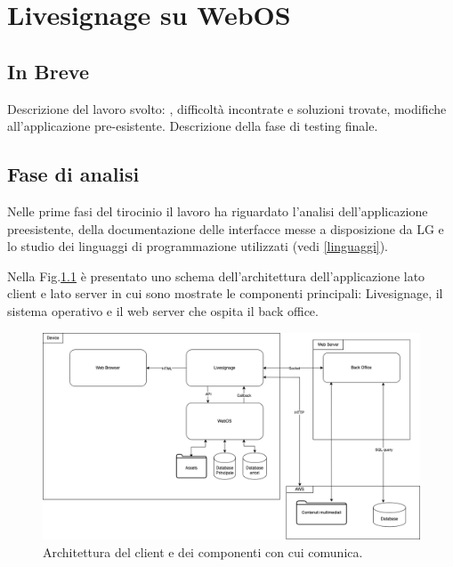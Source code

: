 \chapter{Livesignage su WebOS}\label{svolgimento}
\section{In Breve}
Descrizione del lavoro svolto: , difficoltà incontrate e soluzioni trovate, modifiche all'applicazione pre-esistente. Descrizione della fase di testing finale.

\section{Fase di analisi}

Nelle prime fasi del tirocinio il lavoro ha riguardato l'analisi dell'applicazione preesistente, della documentazione delle interfacce messe a disposizione da LG e lo studio dei linguaggi di programmazione utilizzati (vedi \ref*{linguaggi}).

Nella Fig.\ref*{fig:architettura_2} è presentato uno schema dell'architettura dell'applicazione lato client e lato server in cui sono mostrate le componenti principali: Livesignage, il sistema operativo e il web server che ospita il back office.

\begin{figure}[!htb]
    \centering
    \includegraphics[width= 1\textwidth]{images/svolgimento/webos_client_archi.png} 
    \caption{Architettura del client e dei componenti con cui comunica.} 
    \label{fig:architettura_2}
\end{figure}

